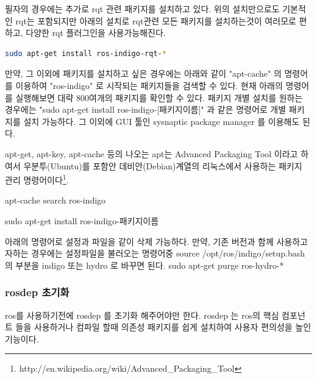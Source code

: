 필자의 경우에는 추가로 rqt 관련 패키지를 설치하고 있다. 위의 설치만으로도 기본적인 rqt는 포함되지만 아래의 설치로 rqt관련 모든 패키지를 설치하는것이 여러모로 편하고, 다양한 rqt 플러그인을 사용가능해진다.

\begin{lstlisting}[language=bash]
sudo apt-get install ros-indigo-rqt-*
\end{lstlisting}

만약, 그 이외에 패키지를 설치하고 싶은 경우에는 아래와 같이  "apt-cache" 의 명령어를 이용하여 "ros-indigo" 로 시작되는 패키지들을 검색할 수 있다. 현재 아래의 명령어를 실행해보면 대략 800여개의 패키지를 확인할 수 있다. 패키지 개별 설치를 원하는 경우에는 "sudo apt-get install ros-indigo-[패키지이름]" 과 같은 명령어로 개별 패키지를 설치 가능하다. 그 이외에 GUI 툴인 sysnaptic package manager 를 이용해도 된다.

\begin{exercise}
apt-get, apt-key, apt-cache 등의 나오는 apt는 Advanced Packaging Tool 이라고 하여서 우분투(Ubuntu)를 포함안 데비안(Debian)계열의 리눅스에서 사용하는 패키지 관리 명령어이다\footnote{http://en.wikipedia.org/wiki/Advanced\_Packaging\_Tool}.
\end{exercise}

\begin{exercise}[패키지 검색 방법]
apt-cache search ros-indigo
\end{exercise}

\begin{exercise}[패키지 개별 설치 방법]
sudo apt-get install ros-indigo-패키지이름
\end{exercise}

\begin{exercise}
아래의 명령어로 설정과 파일을 같이 삭제 가능하다. 만약, 기존 버전과 함께 사용하고자하는 경우에는 설정파일을 불러오는 명령어중 source /opt/ros/indigo/setup.bash 의 부분을 indigo 또는 hydro 로 바꾸면 된다. sudo apt-get purge ros-hydro-*
\end{exercise}

\subsubsection{rosdep 초기화}
ros를 사용하기전에 rosdep 를 초기화 해주어야만 한다. rosdep 는 ros의 핵심 컴포넌트 들을 사용하거나 컴파일 할때 의존성 패키지를 쉽게 설치하여 사용자 편의성을 높인 기능이다.

